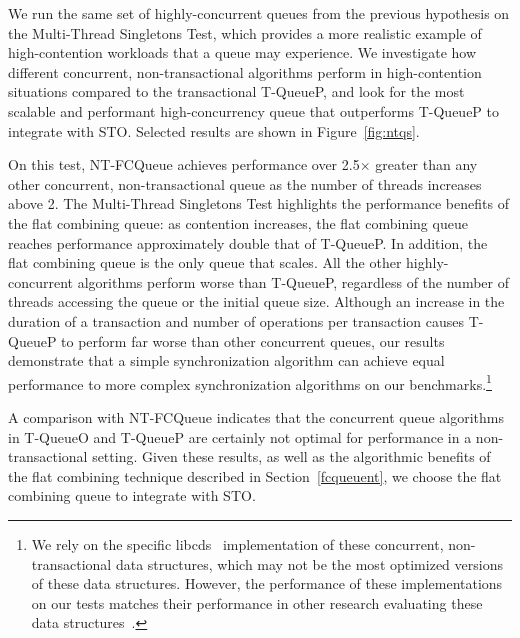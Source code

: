 We run the same set of highly-concurrent queues from the previous hypothesis on the Multi-Thread Singletons Test, which provides a more realistic example of high-contention workloads that a queue may experience. We investigate how different concurrent, non-transactional algorithms perform in high-contention situations compared to the transactional T-QueueP, and look for the most scalable and performant high-concurrency queue that outperforms T-QueueP to integrate with STO. Selected results are shown in Figure~\ref{fig:ntqs}.

On this test, NT-FCQueue achieves performance over 2.5$\times$ greater than any other concurrent, non-transactional queue as the number of threads increases above 2. The Multi-Thread Singletons Test highlights the performance benefits of the flat combining queue: as contention increases, the flat combining queue reaches performance approximately double that of T-QueueP. In addition, the flat combining queue is the only queue that scales. All the other highly-concurrent algorithms perform worse than T-QueueP, regardless of the number of threads accessing the queue or the initial queue size. 
Although an increase in the duration of a transaction and number of operations per transaction causes T-QueueP to perform far worse than other concurrent queues, our results demonstrate that a simple synchronization algorithm can achieve equal performance to more complex synchronization algorithms on our benchmarks.\footnote{We rely on the specific libcds~\cite{libcds} implementation of these concurrent, non-transactional data structures, which may not be the most optimized versions of these data structures. However, the performance of these implementations on our tests matches their performance in other research evaluating these data structures~\cite{queue1, queue3}.}

A comparison with NT-FCQueue indicates that the concurrent queue algorithms in T-QueueO and T-QueueP are certainly not optimal for performance in a non-transactional setting.
Given these results, as well as the algorithmic benefits of the flat combining technique described in Section~\ref{fcqueuent}, we choose the flat combining queue to integrate with STO.

\vspace{12pt}
\noindent{}

